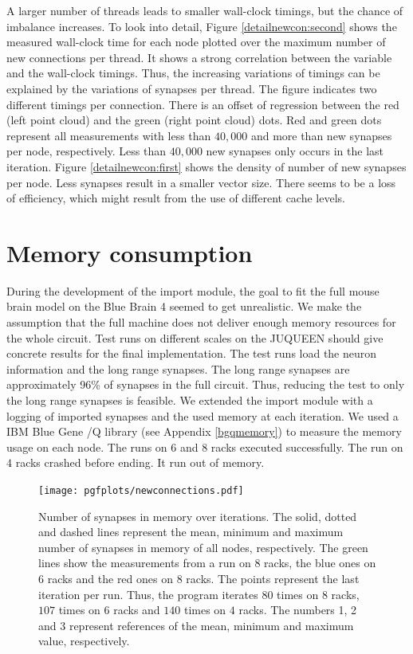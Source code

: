 A larger number of threads leads to smaller wall-clock timings, but the chance of imbalance increases.
To look into detail, Figure \ref{detailnewcon:second} shows the measured wall-clock time for each node
plotted over the maximum number of new connections per thread. It shows a strong correlation between the variable and
the wall-clock timings. Thus, the increasing variations of timings can be explained by the variations of synapses per thread.
The figure indicates two different timings per connection. There is an offset of regression between the red
(left point cloud)
and the green (right point cloud) dots. Red and green dots represent all measurements with less than $40,000$ and more than new synapses per
node, respectively. Less than $40,000$ new synapses only occurs in the last iteration.
Figure \ref{detailnewcon:first} shows the density of number of new synapses per node.
Less synapses result in a smaller vector size. There seems to be a loss of efficiency, which might result from
the use of different cache levels.

\newpage
\section{Memory consumption}
During the development of the import module, the goal to fit the full mouse brain model on the
Blue Brain 4 seemed to get unrealistic. We make the assumption that the full machine does not deliver enough memory resources for the whole circuit.
Test runs on different scales on the JUQUEEN should give concrete results for the final implementation.
The test runs load the neuron information and the long range synapses.
The long range synapses are approximately 96\% of synapses in the full circuit.
Thus, reducing the test to only the long range synapses is feasible.
We extended the import module with a logging of imported synapses and the used memory at each iteration.
We used a IBM Blue Gene /Q library (see Appendix \ref{bgqmemory}) to measure the memory usage on each node.
The runs on $6$ and $8$ racks executed successfully.
The run on $4$ racks crashed before ending.
It run out of memory.

\begin{figure}[h!]
\begin{center}
 \texttt{[image: pgfplots/newconnections.pdf]}
\end{center}
\caption[Number of synapses in memory over iterations]{Number of synapses in memory over iterations.
The solid, dotted and dashed lines represent the mean, minimum and maximum number of synapses in memory of all nodes, respectively.
The green lines show the measurements from a run on 8 racks, the blue ones on 6 racks and the red ones on 8 racks.
The points represent the last iteration per run.
Thus, the program iterates $80$ times on $8$ racks, $107$ times on $6$ racks and $140$ times on $4$ racks.
The numbers 1, 2 and 3 represent references of the mean, minimum and maximum value, respectively.
 }
\label{fig:newconnections}
\end{figure}

